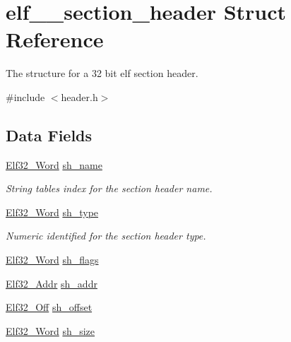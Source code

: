 \hypertarget{structelf__32__section__header}{
\section{elf\_\_\-section\_\-header Struct Reference}
\label{structelf__32__section__header}
}


The structure for a 32 bit elf section header.  




{\ttfamily \#include $<$header.h$>$}

\subsection*{Data Fields}
\begin{DoxyCompactItemize}
\item 
\hyperlink{header_8h_aaf2adb6079d594afee7de40cee594c34}{Elf32\_\-Word} \hyperlink{structelf__32__section__header_a92c7b4858577346a54631f8a41cf6320}{sh\_\-name}
\begin{DoxyCompactList}\small\item\em String tables index for the section header name. \item\end{DoxyCompactList}\item 
\hyperlink{header_8h_aaf2adb6079d594afee7de40cee594c34}{Elf32\_\-Word} \hyperlink{structelf__32__section__header_aa19ec0f26eb1c4e79de6f1b7e7362d7c}{sh\_\-type}
\begin{DoxyCompactList}\small\item\em Numeric identified for the section header type. \item\end{DoxyCompactList}\item 
\hyperlink{header_8h_aaf2adb6079d594afee7de40cee594c34}{Elf32\_\-Word} \hyperlink{structelf__32__section__header_aec02582689021112adef07064ded4494}{sh\_\-flags}
\item 
\hyperlink{header_8h_a6041cee195469c34b94c8605b53a98f9}{Elf32\_\-Addr} \hyperlink{structelf__32__section__header_a39df760c684f21d4e3112988f5576b9f}{sh\_\-addr}
\item 
\hyperlink{header_8h_aa29786fd537fb0970d39bb3b9ed48e96}{Elf32\_\-Off} \hyperlink{structelf__32__section__header_a5f1a922a39c88958afb39326f293389c}{sh\_\-offset}
\item 
\hyperlink{header_8h_aaf2adb6079d594afee7de40cee594c34}{Elf32\_\-Word} \hyperlink{structelf__32__section__header_ae0bb6c0f10c7b5e9242b89f8f02a5acb}{sh\_\-size}

\end{DoxyCompactItemize}

